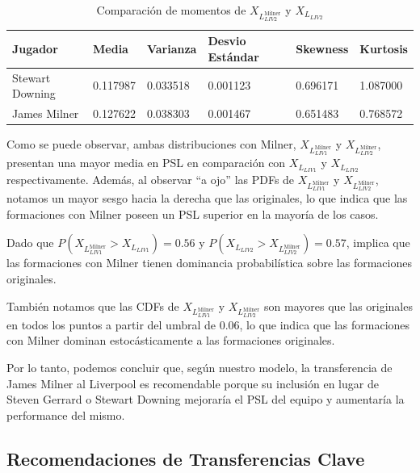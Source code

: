 \documentclass[
  a4paper,
]{article}
\begin{document}
\begin{table}
\caption{Comparación de momentos de $X_{L_{LIV2}^{\text{Milner}}}$ y $X_{L_{LIV2}}$}
\label{tab:comparacion_momentos_psl_Milner_Downing}
\begin{center}
\begin{tabular}{llllll}
\toprule
Jugador & Media & Varianza & Desvio Estándar & Skewness & Kurtosis \\
\midrule
Stewart Downing &  0.117987 &  0.033518 &         0.001123 &  0.696171 &  1.087000 \\
James Milner    &  0.127622 &  0.038303 &         0.001467 &  0.651483 &  0.768572 \\
\bottomrule
\end{tabular}
\end{center}
\end{table}

Como se puede observar, ambas distribuciones con Milner,
\(X_{L_{LIV1}^{\text{Milner}}}\) y \(X_{L_{LIV2}^{\text{Milner}}}\),
presentan una mayor media en PSL en comparación con \(X_{L_{LIV1}}\) y
\(X_{L_{LIV2}}\) respectivamente. Además, al observar ``a ojo'' las PDFs
de \(X_{L_{LIV1}^{\text{Milner}}}\) y \(X_{L_{LIV2}^{\text{Milner}}}\),
notamos un mayor sesgo hacia la derecha que las originales, lo que
indica que las formaciones con Milner poseen un PSL superior en la
mayoría de los casos.

Dado que \(P(X_{L_{LIV1}^{\text{Milner}}} > X_{L_{LIV1}}) = 0.56\) y
\(P(X_{L_{LIV2}} > X_{L_{LIV2}^{\text{Milner}}}) = 0.57\), implica que
las formaciones con Milner tienen dominancia probabilística sobre las
formaciones originales.

También notamos que las CDFs de \(X_{L_{LIV1}^{\text{Milner}}}\) y
\(X_{L_{LIV2}^{\text{Milner}}}\) son mayores que las originales en todos
los puntos a partir del umbral de 0.06, lo que indica que las
formaciones con Milner dominan estocásticamente a las formaciones
originales.

Por lo tanto, podemos concluir que, según nuestro modelo, la
transferencia de James Milner al Liverpool es recomendable porque su
inclusión en lugar de Steven Gerrard o Stewart Downing mejoraría el PSL
del equipo y aumentaría la performance del mismo.

\hypertarget{recomendaciones-de-transferencias-clave}{%
\subsection{Recomendaciones de Transferencias
Clave}\label{recomendaciones-de-transferencias-clave}}
\end{document}
